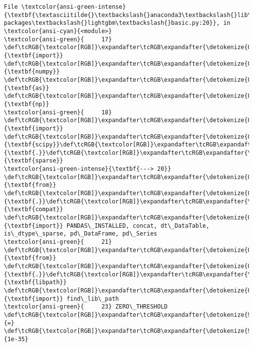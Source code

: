 \documentclass[11pt]{article}
\begin{document}
\begin{Verbatim}[commandchars=\\\{\}, frame=single, framerule=2mm, rulecolor=\color{outerrorbackground}]
File \textcolor{ansi-green-intense}{\textbf{\textasciitilde{}\textbackslash{}anaconda3\textbackslash{}lib\textbackslash{}site-packages\textbackslash{}lightgbm\textbackslash{}basic.py:20}}, in \textcolor{ansi-cyan}{<module>}
\textcolor{ansi-green}{     17} \def\tcRGB{\textcolor[RGB]}\expandafter\tcRGB\expandafter{\detokenize{0,135,0}}{\textbf{import}} \def\tcRGB{\textcolor[RGB]}\expandafter\tcRGB\expandafter{\detokenize{0,0,255}}{\textbf{numpy}} \def\tcRGB{\textcolor[RGB]}\expandafter\tcRGB\expandafter{\detokenize{0,135,0}}{\textbf{as}} \def\tcRGB{\textcolor[RGB]}\expandafter\tcRGB\expandafter{\detokenize{0,0,255}}{\textbf{np}}
\textcolor{ansi-green}{     18} \def\tcRGB{\textcolor[RGB]}\expandafter\tcRGB\expandafter{\detokenize{0,135,0}}{\textbf{import}} \def\tcRGB{\textcolor[RGB]}\expandafter\tcRGB\expandafter{\detokenize{0,0,255}}{\textbf{scipy}}\def\tcRGB{\textcolor[RGB]}\expandafter\tcRGB\expandafter{\detokenize{0,0,255}}{\textbf{.}}\def\tcRGB{\textcolor[RGB]}\expandafter\tcRGB\expandafter{\detokenize{0,0,255}}{\textbf{sparse}}
\textcolor{ansi-green-intense}{\textbf{---> 20}} \def\tcRGB{\textcolor[RGB]}\expandafter\tcRGB\expandafter{\detokenize{0,135,0}}{\textbf{from}} \def\tcRGB{\textcolor[RGB]}\expandafter\tcRGB\expandafter{\detokenize{0,0,255}}{\textbf{.}}\def\tcRGB{\textcolor[RGB]}\expandafter\tcRGB\expandafter{\detokenize{0,0,255}}{\textbf{compat}} \def\tcRGB{\textcolor[RGB]}\expandafter\tcRGB\expandafter{\detokenize{0,135,0}}{\textbf{import}} PANDAS\_INSTALLED, concat, dt\_DataTable, is\_dtype\_sparse, pd\_DataFrame, pd\_Series
\textcolor{ansi-green}{     21} \def\tcRGB{\textcolor[RGB]}\expandafter\tcRGB\expandafter{\detokenize{0,135,0}}{\textbf{from}} \def\tcRGB{\textcolor[RGB]}\expandafter\tcRGB\expandafter{\detokenize{0,0,255}}{\textbf{.}}\def\tcRGB{\textcolor[RGB]}\expandafter\tcRGB\expandafter{\detokenize{0,0,255}}{\textbf{libpath}} \def\tcRGB{\textcolor[RGB]}\expandafter\tcRGB\expandafter{\detokenize{0,135,0}}{\textbf{import}} find\_lib\_path
\textcolor{ansi-green}{     23} ZERO\_THRESHOLD \def\tcRGB{\textcolor[RGB]}\expandafter\tcRGB\expandafter{\detokenize{98,98,98}}{=} \def\tcRGB{\textcolor[RGB]}\expandafter\tcRGB\expandafter{\detokenize{98,98,98}}{1e-35}


\end{Verbatim}
\end{document}
